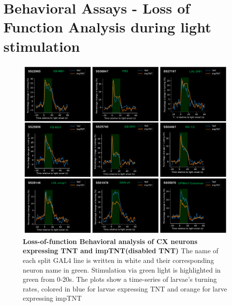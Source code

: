 \section{Behavioral Assays - Loss of Function Analysis during light stimulation}
    \begin{figure}
        \centering
        \includegraphics[width=12cm]{Figs/CX/BehaviourAssays.pdf}
        \caption[Loss of Function Analysis during Light Stimulation]{\textbf{Loss-of-function Behavioral analysis of CX neurons expressing TNT and impTNT(disabled TNT)} The name of each split GAL4 line is written in white and their corresponding neuron name in green. Stimulation via green light is highlighted in green from 0-20s. The plots show a time-series of larvae's turning rates, colored in blue for larvae expressing TNT and orange for larve expressing impTNT}
        \label{LOS}
    \end{figure}

